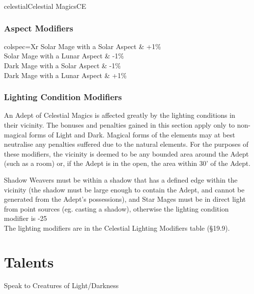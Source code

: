 \begin{College}[1.3]{celestial}{Celestial Magics}{CE}
\subsubsection{Aspect Modifiers}

\begin{dqtblr}{colspec={Xr}}
Solar Mage with a Solar Aspect	& +1\% \\
Solar Mage with a Lunar Aspect	& -1\% \\
Dark Mage with a Solar Aspect	& -1\% \\
Dark Mage with a Lunar Aspect	& +1\% \\
\end{dqtblr}

\subsubsection{Lighting Condition Modifiers}

An Adept of Celestial Magics is affected greatly by the lighting
conditions in their vicinity.  The bonuses and penalties gained in
this section apply only to non-magical forms of Light and Dark.
Magical forms of the elements may at best neutralise any penalties
suffered due to the natural elements.  For the purposes of these
modifiers, the vicinity is deemed to be any bounded area around the
Adept (such as a room) or, if the Adept is in the open, the area
within 30’ of the Adept.

Shadow Weavers must be within a shadow that has a defined edge within
the vicinity (the shadow must be large enough to contain the Adept,
and cannot be generated from the Adept’s possessions), and Star Mages
must be in direct light from point sources (eg. casting a shadow),
otherwise the lighting condition modifier is -25\\%

The lighting modifiers are in the Celestial Lighting Modifiers table
(§19.9).


\section{Talents}

\begin{talent}[T-1]{Speak to Creatures of Light/Darkness}


\end{talent}
\end{College}

